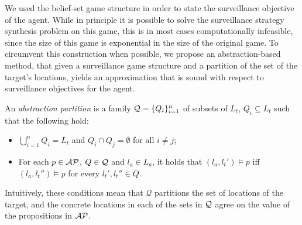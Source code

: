We used the belief-set game structure in order to state the surveillance objective of the agent. While in principle it is possible to solve the surveillance strategy synthesis problem on this game, this is in most cases computationally infeasible, since the size of this game is exponential in the size of the original game. To circumvent this construction when possible, we propose an abstraction-based method, that given a surveillance game structure and a partition of the set of the target's locations, yields an approximation that is sound with respect to surveillance objectives for the agent.


An \emph{abstraction partition} is a family $\mathcal{Q} = \{Q_i\}_{i=1}^n$ of subsets of $L_t$, $Q_i \subseteq L_t$ such that the following hold:
\begin{itemize}
\item $\bigcup_{i=1}^n Q_i = L_t$ and $Q_i \cap Q_j = \emptyset$ for all $i \neq j$;
\item For each $p \in \mathcal{AP}$, $Q \in \mathcal{Q}$ and $l_a \in L_a$, it holds that $(l_a,l_t') \models p$ iff $(l_a,l_t'') \models p$ for every $l_t',l_t'' \in Q$.
\end{itemize}
Intuitively, these conditions mean that $\mathcal Q$ partitions the set of locations of the target, and the concrete locations in each of the sets in $\mathcal{Q}$ agree on the value of the  propositions in $\mathcal{AP}$.

